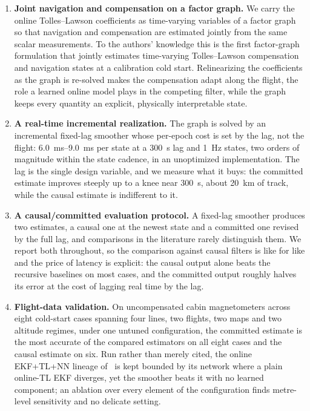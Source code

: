 \documentclass{IEEEtaes}
\begin{document}
\begin{enumerate}
  \item \textbf{Joint navigation and compensation on a factor graph.} We carry
        the online Tolles--Lawson coefficients as time-varying variables of a
        factor graph so that navigation and compensation are estimated jointly
        from the same scalar measurements. To the authors' knowledge this is
        the first factor-graph formulation that jointly estimates time-varying
        Tolles--Lawson compensation and navigation states at a calibration cold
        start. Relinearizing the coefficients as the graph is re-solved makes
        the compensation adapt along the flight, the role a learned online
        model plays in the competing filter, while the graph keeps every
        quantity an explicit, physically interpretable state.
  \item \textbf{A real-time incremental realization.} The graph is solved by an
        incremental fixed-lag smoother whose per-epoch cost is set by the lag,
        not the flight: \SIrange{6.0}{9.0}{\milli\second} per state at a
        \SI{300}{\second} lag and \SI{1}{\hertz} states, two orders of
        magnitude within the state cadence, in an unoptimized implementation.
        The lag is the single design variable, and we measure what it buys: the
        committed estimate improves steeply up to a knee near
        \SI{300}{\second}, about \SI{20}{\kilo\meter} of track, while the
        causal estimate is indifferent to it.
  \item \textbf{A causal/committed evaluation protocol.} A fixed-lag smoother
        produces two estimates, a causal one at the newest state and a
        committed one revised by the full lag, and comparisons in the
        literature rarely distinguish them. We report both throughout, so the
        comparison against causal filters is like for like and the price of
        latency is explicit: the causal output alone beats the recursive
        baselines on most cases, and the committed output roughly halves its
        error at the cost of lagging real time by the lag.
  \item \textbf{Flight-data validation.} On uncompensated cabin magnetometers
        across eight cold-start cases spanning four lines, two flights, two
        maps and two altitude regimes, under one untuned configuration, the
        committed estimate is the most accurate of the compared estimators on
        all eight cases and the causal estimate on six. Run rather than merely
        cited, the online EKF+TL+NN lineage of~\cite{gnadt2022,hager2026} is
        kept bounded by its network where a plain online-TL EKF diverges, yet
        the smoother beats it with no learned component; an ablation over
        every element of the configuration finds metre-level sensitivity and
        no delicate setting.
\end{enumerate}
\end{document}
